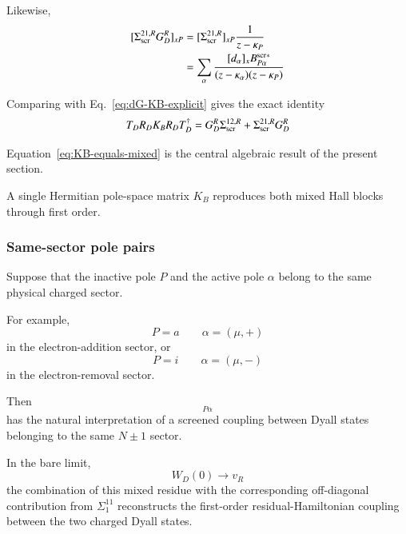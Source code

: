 \documentclass[aip,jcp,reprint,noshowkeys,superscriptaddress]{revtex4-1}
\begin{document}
Likewise,
\begin{equation}
  \begin{aligned}
  [\Sigma_{\rm scr}^{21,R}G_D^R]_{xP}
  &=
  [\Sigma_{\rm scr}^{21,R}]_{xP}
  \frac{1}{z-\kappa_P}
  \\
  &=
  \sum_\alpha
  \frac{
    [d_\alpha]_x
    B_{P\alpha}^{{\rm scr}*}
  }{
    (z-\kappa_\alpha)
    (z-\kappa_P)
  }
  \end{aligned}
\end{equation}

Comparing with Eq.~\eqref{eq:dG-KB-explicit} gives the exact identity
\begin{equation}
  T_DR_DK_BR_DT_D^\dagger
  =
  G_D^R\Sigma_{\rm scr}^{12,R}
  +
  \Sigma_{\rm scr}^{21,R}G_D^R
  \label{eq:KB-equals-mixed}
\end{equation}

Equation~\eqref{eq:KB-equals-mixed} is the central algebraic result of
the present section.

A single Hermitian pole-space matrix $K_B$ reproduces both mixed Hall
blocks through first order.


\subsubsection{Same-sector pole pairs}

Suppose that the inactive pole $P$ and the active pole $\alpha$ belong
to the same physical charged sector.

For example,
\begin{equation}
  P=a
  \qquad
  \alpha=(\mu,+)
\end{equation}
in the electron-addition sector, or
\begin{equation}
  P=i
  \qquad
  \alpha=(\mu,-)
\end{equation}
in the electron-removal sector.

Then
\begin{equation}
  [K_B]_{P\alpha}
\end{equation}
has the natural interpretation of a screened coupling between Dyall
states belonging to the same $N\pm1$ sector.

In the bare limit,
\begin{equation}
  W_D(0)\rightarrow v_R
\end{equation}
the combination of this mixed residue with the corresponding
off-diagonal contribution from $\Sigma_1^{11}$ reconstructs the
first-order residual-Hamiltonian coupling between the two charged
Dyall states.
\end{document}
